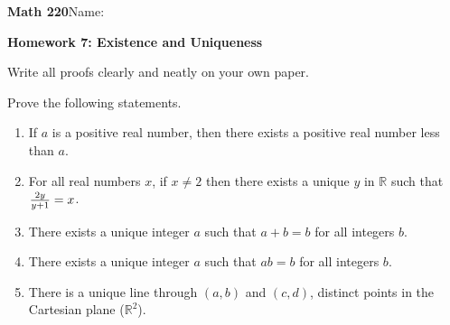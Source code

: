 \documentclass{article}
\begin{document}
{\bf Math 220}\hfill{Name:}

{\bf Homework 7: Existence and Uniqueness}
\vspace{.3in}

Write all proofs clearly and neatly on your own paper.

Prove the following statements.



\begin{enumerate}



\item If $a$ is a positive real number, then there exists a positive real number less than $a$.

\item For all real numbers $x$, if $x\neq 2$ then there exists a unique $y$ in $\mathbb{R}$ such that ${2y\over y+1}=x$.

\item There exists a unique integer $a$ such that $a+b=b$ for all integers $b$.


\item There exists a unique integer $a$ such that $ab=b$ for all integers $b$.

\item There is  a unique line through  $(a,b)$ and $(c,d)$,  distinct points in the Cartesian plane ($\mathbb{R}^2$).

\end{enumerate}
\end{document}
